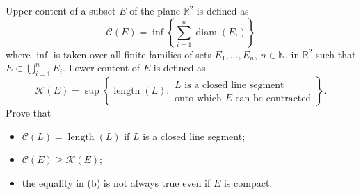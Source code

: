 Upper content of a subset \(E\) of the plane \(\mathbb{R}^{2}\) is defined as
\[\mathcal{C}(E)=\inf\left\{\sum_{i=1}^{n} \operatorname{diam}(E_{i})\right\}\]where \(\inf\) is taken over all finite families of sets \(E_{1},\dots,E_{n}\), \(n\in \mathbb{N}\), in \(\mathbb{R}^{2}\)
such that \(E\subset \bigcup_{i=1}^{n}E_{i}\).
Lower content of \(E\) is defined as
\[\mathcal{K}(E)=\sup\left\{\operatorname{length}(L) : \begin{array}{l} \text{\(L\) is a closed line segment} \\ \text{onto which \(E\) can be contracted} \end{array} \right\}.\]
Prove that
\begin{itemize}
\item[(a)] \(\mathcal{C}(L)=\operatorname{length}(L)\) if \(L\) is a closed line segment;
\item[(b)] \(\mathcal{C}(E) \geq \mathcal{K}(E)\);
\item[(c)] the equality in (b) is not always true even if \(E\) is compact.
\end{itemize}